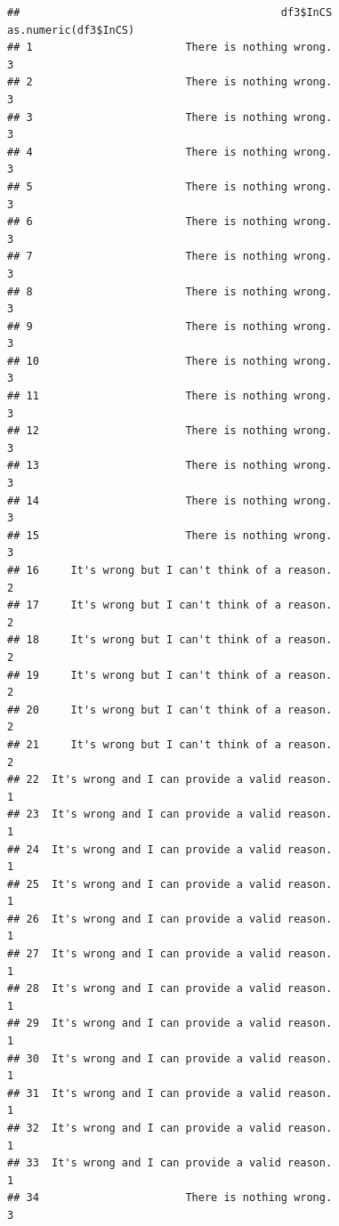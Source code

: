 \documentclass[
  american,
  man,floatsintext]{apa7}
\begin{document}
\begin{verbatim}
##                                         df3$InCS as.numeric(df3$InCS)
## 1                        There is nothing wrong.                    3
## 2                        There is nothing wrong.                    3
## 3                        There is nothing wrong.                    3
## 4                        There is nothing wrong.                    3
## 5                        There is nothing wrong.                    3
## 6                        There is nothing wrong.                    3
## 7                        There is nothing wrong.                    3
## 8                        There is nothing wrong.                    3
## 9                        There is nothing wrong.                    3
## 10                       There is nothing wrong.                    3
## 11                       There is nothing wrong.                    3
## 12                       There is nothing wrong.                    3
## 13                       There is nothing wrong.                    3
## 14                       There is nothing wrong.                    3
## 15                       There is nothing wrong.                    3
## 16     It's wrong but I can't think of a reason.                    2
## 17     It's wrong but I can't think of a reason.                    2
## 18     It's wrong but I can't think of a reason.                    2
## 19     It's wrong but I can't think of a reason.                    2
## 20     It's wrong but I can't think of a reason.                    2
## 21     It's wrong but I can't think of a reason.                    2
## 22  It's wrong and I can provide a valid reason.                    1
## 23  It's wrong and I can provide a valid reason.                    1
## 24  It's wrong and I can provide a valid reason.                    1
## 25  It's wrong and I can provide a valid reason.                    1
## 26  It's wrong and I can provide a valid reason.                    1
## 27  It's wrong and I can provide a valid reason.                    1
## 28  It's wrong and I can provide a valid reason.                    1
## 29  It's wrong and I can provide a valid reason.                    1
## 30  It's wrong and I can provide a valid reason.                    1
## 31  It's wrong and I can provide a valid reason.                    1
## 32  It's wrong and I can provide a valid reason.                    1
## 33  It's wrong and I can provide a valid reason.                    1
## 34                       There is nothing wrong.                    3

\end{verbatim}
\end{document}
